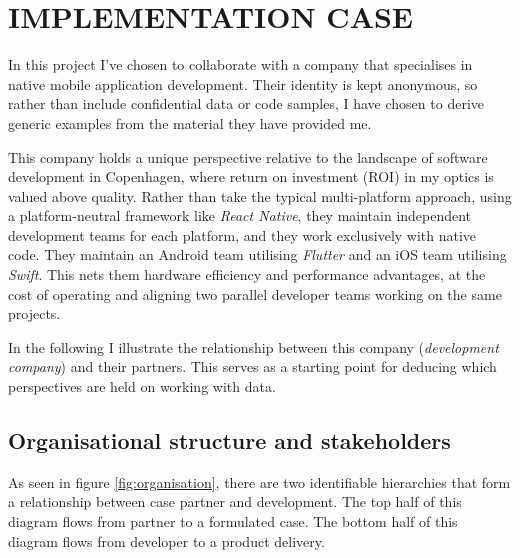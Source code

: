 \documentclass[../report.tex]{subfiles}
\begin{document}
\section{IMPLEMENTATION CASE} \label{sec:case}

In this project I've chosen to collaborate with a company that specialises in native mobile application development. Their identity is kept anonymous, so rather than include confidential data or code samples, I have chosen to derive generic examples from the material they have provided me.

This company holds a unique perspective relative to the landscape of software development in Copenhagen, where return on investment (ROI) in my optics is valued above quality. Rather than take the typical multi-platform approach, using a platform-neutral framework like \textit{React Native}, they maintain independent development teams for each platform, and they work exclusively with native code. They maintain an Android team utilising \textit{Flutter} and an iOS team utilising \textit{Swift}. This nets them hardware efficiency and performance advantages, at the cost of operating and aligning two parallel developer teams working on the same projects.

In the following I illustrate the relationship between this company (\textit{development company}) and their partners. This serves as a starting point for deducing which perspectives are held on working with data.


\subsection{Organisational structure and stakeholders}

As seen in figure \ref{fig:organisation}, there are two identifiable hierarchies that form a relationship between case partner and development. The top half of this diagram flows from partner to a formulated case. The bottom half of this diagram flows from developer to a product delivery.
\end{document}
